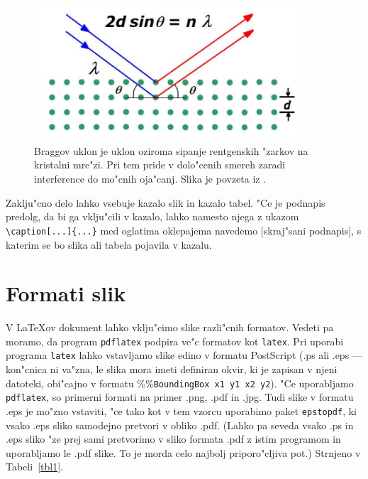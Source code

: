 \begin{figure}[h]
\begin{center}
\includegraphics[width=10cm]{Bragglaw}
\end{center}
\caption[Braggov uklon.]{Braggov uklon je uklon oziroma sipanje 
rentgenskih "zarkov na kristalni mre"zi. Pri tem pride v dolo"cenih 
smereh zaradi interference do mo"cnih oja"canj. 
Slika je povzeta iz \cite{Bragg}.}
\label{pic1}
\end{figure}



Zaklju"cno delo lahko vsebuje kazalo slik in kazalo tabel. 
"Ce je podnapis predolg, da bi ga vklju"cili v kazalo, lahko 
namesto njega z ukazom \verb|\caption[...]{...}| med oglatima
oklepajema navedemo [skraj"sani podnapis], s katerim se bo slika 
ali tabela pojavila v kazalu.

\newpage
\section{Formati slik}

V \LaTeX{}ov dokument lahko vklju"cimo slike razli"cnih formatov. 
Vedeti pa moramo, da program {\tt pdflatex} podpira ve"c formatov 
kot {\tt latex}. Pri uporabi programa {\tt latex} lahko vstavljamo 
slike edino v formatu PostScript (.ps ali .eps --- kon"cnica ni
va"zna, le slika mora imeti definiran okvir, ki je zapisan
v njeni datoteki, obi"cajno v formatu \%\%{\tt BoundingBox x1 y1 x2 y2}). 
"Ce uporabljamo {\tt pdflatex}, so primerni formati na primer 
.png, .pdf in .jpg.  Tudi slike v formatu .eps je mo"zno vstaviti,
"ce tako kot v tem vzorcu uporabimo paket {\tt epstopdf}, ki vsako
.eps sliko samodejno pretvori v obliko .pdf.  (Lahko pa seveda
vsako .ps in .eps sliko "ze prej sami pretvorimo v sliko formata .pdf
z istim programom in uporabljamo le .pdf slike.  To je morda
celo najbolj priporo"cljiva pot.)  Strnjeno v Tabeli~\ref{tbl1}.

